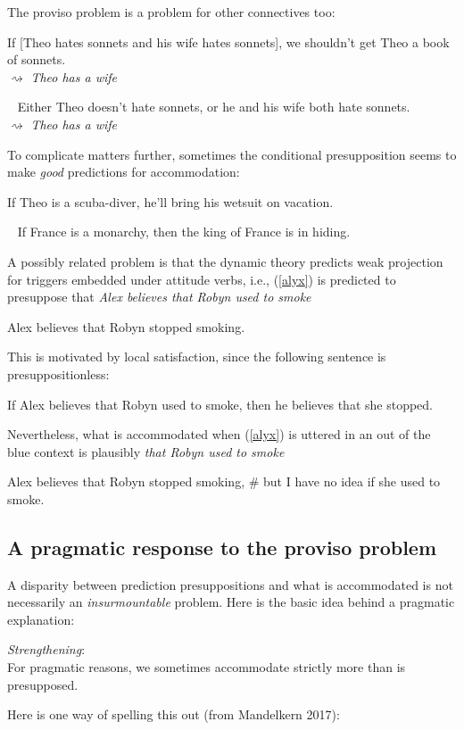 \documentclass[nols,twoside,nofonts,nobib,nohyper]{tufte-handout}
\begin{document}
The proviso problem is a problem for other connectives too:

\ex
If [Theo hates sonnets and his wife hates sonnets], we shouldn't get Theo a book of sonnets.\\
\(⇝\) \textit{Theo has a wife}
\xe

\ex~
Either Theo doesn't hate sonnets, or he and his wife both hate sonnets.\\
\(⇝\) \textit{Theo has a wife}
\xe

To complicate matters further, sometimes the conditional presupposition seems to make \textit{good} predictions for accommodation:

\ex
If Theo is a scuba-diver, he'll bring his wetsuit on vacation.
\xe

\ex~
If France is a monarchy, then the king of France is in hiding.
\xe

A possibly related problem is that the dynamic theory predicts weak projection for triggers embedded under attitude verbs, i.e., (\ref{alyx}) is predicted to presuppose that \textit{Alex believes that Robyn used to smoke}

\ex\label{alyx}Alex believes that Robyn stopped smoking.
\xe

This is motivated by local satisfaction, since the following sentence is presuppositionless:

\ex
If Alex believes that Robyn used to smoke, then he believes that she stopped.
\xe

Nevertheless, what is accommodated when (\ref{alyx}) is uttered in an out of the blue context is plausibly \textit{that Robyn used to smoke}

\ex
Alex believes that Robyn stopped smoking, \# but I have no idea if she used to smoke.
\xe

\subsection{A pragmatic response to the proviso problem}


A disparity between prediction presuppositions and what is accommodated is not necessarily an \textit{insurmountable} problem. Here is the basic idea behind a pragmatic explanation:

\ex
\textit{Strengthening}:\\
For pragmatic reasons, we sometimes accommodate strictly more than is presupposed.
\xe

Here is one way of spelling this out (from Mandelkern 2017):
\end{document}
